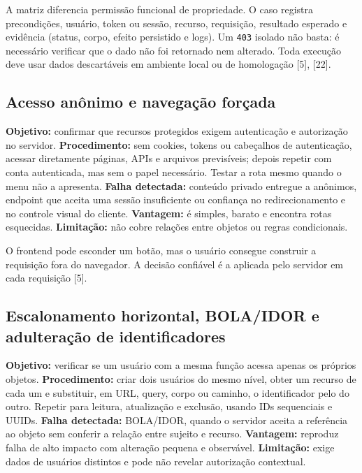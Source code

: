 A matriz diferencia permissão funcional de propriedade. O caso registra
precondições, usuário, token ou sessão, recurso, requisição, resultado
esperado e evidência (status, corpo, efeito persistido e logs). Um
\texttt{403} isolado não basta: é necessário verificar que o dado não
foi retornado nem alterado. Toda execução deve usar dados descartáveis
em ambiente local ou de homologação {[}5{]}, {[}22{]}.

\subsection{Acesso anônimo e navegação
forçada}\label{acesso-anuxf4nimo-e-navegauxe7uxe3o-foruxe7ada}

\textbf{Objetivo:} confirmar que recursos protegidos exigem autenticação
e autorização no servidor. \textbf{Procedimento:} sem cookies, tokens ou
cabeçalhos de autenticação, acessar diretamente páginas, APIs e arquivos
previsíveis; depois repetir com conta autenticada, mas sem o papel
necessário. Testar a rota mesmo quando o menu não a apresenta.
\textbf{Falha detectada:} conteúdo privado entregue a anônimos, endpoint
que aceita uma sessão insuficiente ou confiança no redirecionamento e no
controle visual do cliente. \textbf{Vantagem:} é simples, barato e
encontra rotas esquecidas. \textbf{Limitação:} não cobre relações entre
objetos ou regras condicionais.

O frontend pode esconder um botão, mas o usuário consegue construir a
requisição fora do navegador. A decisão confiável é a aplicada pelo
servidor em cada requisição {[}5{]}.

\subsection{Escalonamento horizontal, BOLA/\allowbreak{}IDOR e adulteração de
identificadores}\label{escalonamento-horizontal-bolaidor-e-adulterauxe7uxe3o-de-identificadores}

\textbf{Objetivo:} verificar se um usuário com a mesma função acessa
apenas os próprios objetos. \textbf{Procedimento:} criar dois usuários
do mesmo nível, obter um recurso de cada um e substituir, em URL, query,
corpo ou caminho, o identificador pelo do outro. Repetir para leitura,
atualização e exclusão, usando IDs sequenciais e UUIDs. \textbf{Falha
detectada:} BOLA/\allowbreak{}IDOR, quando o servidor aceita a referência ao objeto
sem conferir a relação entre sujeito e recurso. \textbf{Vantagem:}
reproduz falha de alto impacto com alteração pequena e observável.
\textbf{Limitação:} exige dados de usuários distintos e pode não revelar
autorização contextual.


